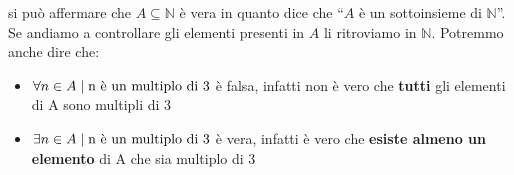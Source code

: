 \documentclass[12pt,a4paper]{article}
\newcommand{\Setsuchthat}{\;\ifnum\currentgrouptype=16 \middle\fi|\;}
\begin{document}
  si può affermare che $ A \subseteq \mathbb{N} $ è vera in quanto dice che ``$A$ è un sottoinsieme
  di $\mathbb{N}$''. Se andiamo a controllare gli elementi presenti in $A$ li ritroviamo
  in $\mathbb{N}$. Potremmo anche dire che:

  \begin{itemize}
    \item $ \forall n \in A \Setsuchthat \text{n è un multiplo di 3} $ è falsa, infatti non è vero che \textbf{tutti} gli elementi di A sono multipli di 3

    \item $ \exists n \in A \Setsuchthat \text{n è un multiplo di 3} $ è vera, infatti è vero che \textbf{esiste almeno un elemento} di A che sia multiplo di 3
  \end{itemize}
  
\end{document}
